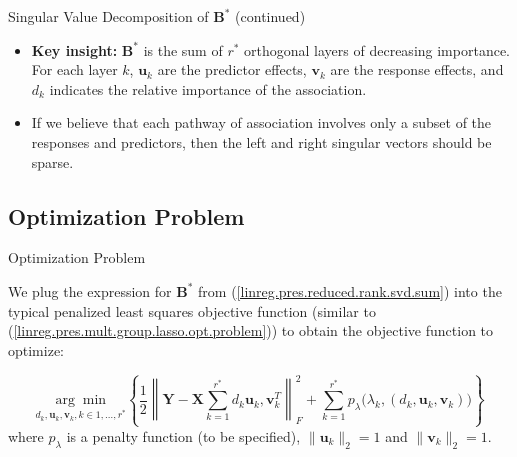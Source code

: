 \documentclass[notes]{beamer}       %
\begin{document}


\begin{frame}{Singular Value Decomposition of \( \boldsymbol{B}^*\) (continued)}
  \begin{itemize}

   \item{\textbf{Key insight:} \( \boldsymbol{B}^*\) is the sum of \(r^*\) orthogonal layers of decreasing importance. For each layer \(k\), \(\boldsymbol{u}_k\) are the predictor effects, \(\boldsymbol{v}_k\) are the response effects, and \(d_k\) indicates the relative importance of the association.
   }
   \item{If we believe that each pathway of association involves only a subset of the responses and predictors, then the left and right singular vectors should be sparse.
   }
  \end{itemize}
\end{frame}

\subsection{Optimization Problem}

\begin{frame}{Optimization Problem}

   We plug the expression for \( \boldsymbol{B}^*\) from (\ref{linreg.pres.reduced.rank.svd.sum}) into the typical penalized least squares objective function (similar to (\ref{linreg.pres.mult.group.lasso.opt.problem})) to obtain the objective function to optimize:
   
   \begin{equation}\label{linreg.pres.reduced.rank.svd.opt.problem}
    \underset{d_k, \boldsymbol{u}_k, \boldsymbol{v}_k, k \in 1, \ldots, r^*}{\arg \min} \left\{ \frac{1}{2} \left\lVert \boldsymbol{Y} - \boldsymbol{X} \sum_{k=1}^{r^*} d_k  \boldsymbol{u}_k, \boldsymbol{v}_k^T \right\rVert_F^2 + \sum_{k=1}^{r^*} p_\lambda \big( \lambda_k, (d_k, \boldsymbol{u}_k, \boldsymbol{v}_k) \big) \right \}
    \end{equation}
    where \(p_\lambda\) is a penalty function (to be specified), \( \lVert  \boldsymbol{u}_k \rVert_2 = 1\) and \( \lVert \boldsymbol{v}_k \rVert_2 = 1\).
 
\end{frame}
\end{document}
